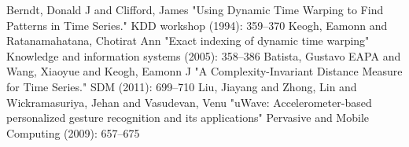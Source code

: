 \documentclass[runningheads,a4paper]{llncs}
\begin{document}


    \begin{thebibliography}{1}
         Berndt, Donald J and Clifford, James "Using Dynamic Time Warping to Find Patterns in
        Time Series." KDD workshop (1994): 359--370
         Keogh, Eamonn and Ratanamahatana, Chotirat Ann "Exact indexing of dynamic time warping"
        Knowledge and information systems (2005): 358--386
         Batista, Gustavo EAPA and Wang, Xiaoyue and Keogh, Eamonn J "A
        Complexity-Invariant Distance Measure for Time Series." SDM (2011): 699--710
         Liu, Jiayang and Zhong, Lin and Wickramasuriya, Jehan and Vasudevan, Venu "uWave:
        Accelerometer-based personalized gesture recognition and its applications" Pervasive and Mobile Computing
        (2009): 657--675
    \end{thebibliography}
\end{document}
